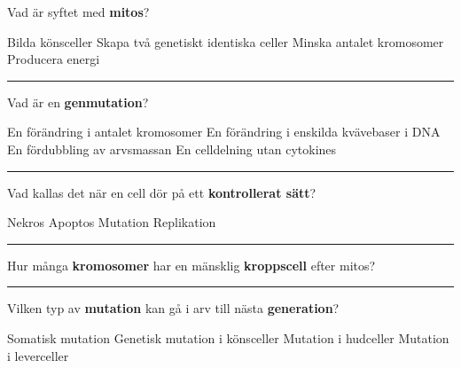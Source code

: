 \documentclass{exam}
\begin{document}

\vspace{5mm}
\begin{center}
\end{center}
\vspace{5mm}

\begin{questions}


\question Vad är syftet med \textbf{mitos}?
\begin{checkboxes}
   \choice Bilda könsceller
   \correctchoice Skapa två genetiskt identiska celler
   \choice Minska antalet kromosomer
   \choice Producera energi
\end{checkboxes}

\vspace{5mm}\hrule\vspace{5mm}

\question Vad är en \textbf{genmutation}?
\begin{checkboxes}
   \choice En förändring i antalet kromosomer
   \correctchoice En förändring i enskilda kvävebaser i DNA
   \choice En fördubbling av arvsmassan
   \choice En celldelning utan cytokines
\end{checkboxes}

\vspace{5mm}\hrule\vspace{5mm}

\question Vad kallas det när en cell dör på ett \textbf{kontrollerat sätt}?
\begin{checkboxes}
   \choice Nekros
   \correctchoice Apoptos
   \choice Mutation
   \choice Replikation
\end{checkboxes}

\vspace{5mm}\hrule\vspace{5mm}

\question Hur många \textbf{kromosomer} har en mänsklig \textbf{kroppscell} efter mitos?
\begin{checkboxes}
\end{checkboxes}

\vspace{5mm}\hrule\vspace{5mm}

\question Vilken typ av \textbf{mutation} kan gå i arv till nästa \textbf{generation}?
\begin{checkboxes}
   \choice Somatisk mutation
   \correctchoice Genetisk mutation i könsceller
   \choice Mutation i hudceller
   \choice Mutation i leverceller
\end{checkboxes}


\end{questions}
\end{document}
